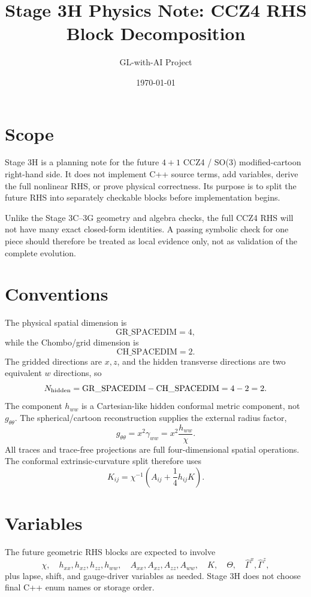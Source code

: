 \documentclass[11pt]{article}
\title{Stage 3H Physics Note: CCZ4 RHS Block Decomposition}
\author{GL-with-AI Project}
\date{\today}
\begin{document}
\maketitle

\section{Scope}

Stage 3H is a planning note for the future \(4+1\) CCZ4 / SO(3)
modified-cartoon right-hand side. It does not implement C++ source terms, add
variables, derive the full nonlinear RHS, or prove physical correctness. Its
purpose is to split the future RHS into separately checkable blocks before
implementation begins.

Unlike the Stage 3C--3G geometry and algebra checks, the full CCZ4 RHS will
not have many exact closed-form identities. A passing symbolic check for one
piece should therefore be treated as local evidence only, not as validation of
the complete evolution.

\section{Conventions}

The physical spatial dimension is
\[
  \mathrm{GR\_SPACEDIM}=4,
\]
while the Chombo/grid dimension is
\[
  \mathrm{CH\_SPACEDIM}=2.
\]
The gridded directions are \(x,z\), and the hidden transverse directions are
two equivalent \(w\) directions, so
\[
  N_{\rm hidden}
  =
  \mathrm{GR\_SPACEDIM}-\mathrm{CH\_SPACEDIM}
  =
  4-2=2.
\]
The component \(h_{ww}\) is a Cartesian-like hidden conformal metric component,
not \(g_{\theta\theta}\). The spherical/cartoon reconstruction supplies the
external radius factor,
\[
  g_{\theta\theta}
  =
  x^2\gamma_{ww}
  =
  x^2\frac{h_{ww}}{\chi}.
\]
All traces and trace-free projections are full four-dimensional spatial
operations. The conformal extrinsic-curvature split therefore uses
\[
  K_{ij}
  =
  \chi^{-1}
  \left(A_{ij}+\frac{1}{4}h_{ij}K\right).
\]

\section{Variables}

The future geometric RHS blocks are expected to involve
\[
  \chi,\quad
  h_{xx},h_{xz},h_{zz},h_{ww},\quad
  A_{xx},A_{xz},A_{zz},A_{ww},\quad
  K,\quad
  \Theta,\quad
  \hat{\Gamma}^x,\hat{\Gamma}^z,
\]
plus lapse, shift, and gauge-driver variables as needed. Stage 3H does not
choose final C++ enum names or storage order.
\end{document}
